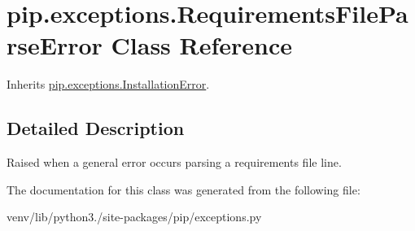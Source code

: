 \hypertarget{classpip_1_1exceptions_1_1_requirements_file_parse_error}{}\section{pip.\+exceptions.\+Requirements\+File\+Parse\+Error Class Reference}
\label{classpip_1_1exceptions_1_1_requirements_file_parse_error}


Inherits \hyperlink{classpip_1_1exceptions_1_1_installation_error}{pip.\+exceptions.\+Installation\+Error}.



\subsection{Detailed Description}
\begin{DoxyVerb}Raised when a general error occurs parsing a requirements file line.\end{DoxyVerb}
 

The documentation for this class was generated from the following file\+:\begin{DoxyCompactItemize}
\item 
venv/lib/python3./site-\/packages/pip/exceptions.\+py\end{DoxyCompactItemize}
